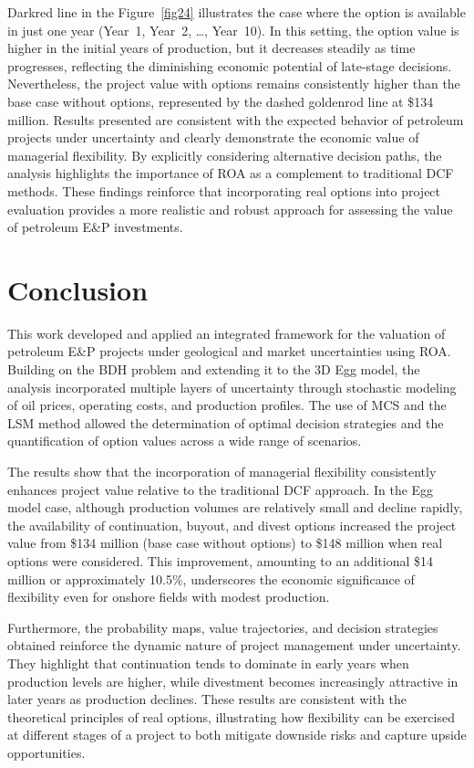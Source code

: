 \documentclass[pdflatex,sn-basic]{sn-jnl}%
\theoremstyle{thmstyleone}%
\theoremstyle{thmstyletwo}%
\theoremstyle{thmstylethree}%
\begin{document}
Darkred line in the Figure~\ref{fig24}  illustrates the case where the option is available in just one year (Year~1, Year~2, …, Year~10). In this setting, the option value is higher in the initial years of production, but it decreases steadily as time progresses, reflecting the diminishing economic potential of late-stage decisions. Nevertheless, the project value with options remains consistently higher than the base case without options, represented by the dashed goldenrod line at \$134 million. Results presented are consistent with the expected behavior of petroleum projects under uncertainty and clearly demonstrate the economic value of managerial flexibility. By explicitly considering alternative decision paths, the analysis highlights the importance of ROA as a complement to traditional DCF methods. These findings reinforce that incorporating real options into project evaluation provides a more realistic and robust approach for assessing the value of petroleum E\&P investments.

\section{Conclusion}\label{sec6}

This work developed and applied an integrated framework for the valuation of petroleum E\&P projects under geological and market uncertainties using ROA. Building on the BDH problem and extending it to the 3D Egg model, the analysis incorporated multiple layers of uncertainty through stochastic modeling of oil prices, operating costs, and production profiles. The use of MCS and the LSM method allowed the determination of optimal decision strategies and the quantification of option values across a wide range of scenarios.

The results show that the incorporation of managerial flexibility consistently enhances project value relative to the traditional DCF approach. In the Egg model case, although production volumes are relatively small and decline rapidly, the availability of continuation, buyout, and divest options increased the project value from \$134 million (base case without options) to \$148 million when real options were considered. This improvement, amounting to an additional \$14 million or approximately 10.5\%, underscores the economic significance of flexibility even for onshore fields with modest production.

Furthermore, the probability maps, value trajectories, and decision strategies obtained reinforce the dynamic nature of project management under uncertainty. They highlight that continuation tends to dominate in early years when production levels are higher, while divestment becomes increasingly attractive in later years as production declines. These results are consistent with the theoretical principles of real options, illustrating how flexibility can be exercised at different stages of a project to both mitigate downside risks and capture upside opportunities.
\end{document}
